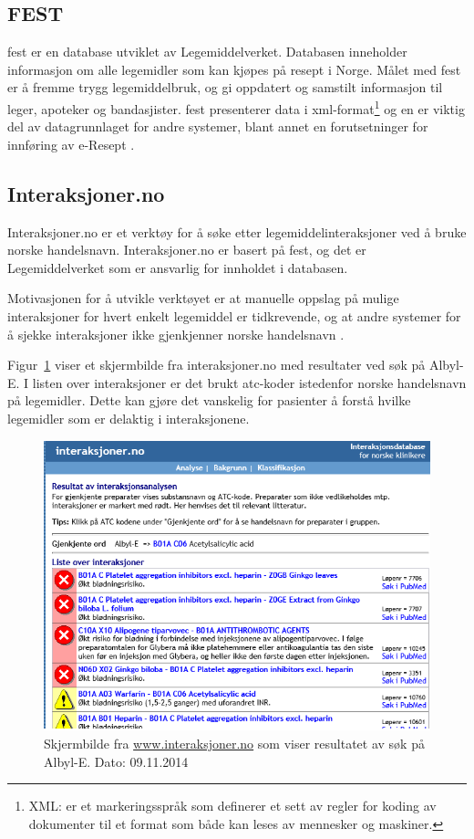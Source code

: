 \subsection{FEST}
\acrfull{fest} er en database utviklet av Legemiddelverket. Databasen inneholder informasjon om alle legemidler som kan kjøpes på resept i Norge. Målet med \acrshort{fest} er å fremme trygg legemiddelbruk, og gi oppdatert og samstilt informasjon til leger, apoteker og bandasjister. \acrshort{fest} presenterer data i \acrshort{xml}-format\footnote{XML: er et markeringsspråk som definerer et sett av regler for koding av dokumenter til et format som både kan leses av mennesker og maskiner.} og en er viktig del av datagrunnlaget for andre systemer, blant annet en forutsetninger for innføring av e-Resept \citep{omFEST}. 

\subsection{Interaksjoner.no}
Interaksjoner.no er et verktøy for å søke etter legemiddelinteraksjoner ved å bruke norske handelsnavn. Interaksjoner.no er basert på \acrshort{fest}, og det er Legemiddelverket som er ansvarlig for innholdet i databasen. 

Motivasjonen for å utvikle verktøyet er at manuelle oppslag på mulige interaksjoner for hvert enkelt legemiddel er tidkrevende, og at andre systemer for å sjekke interaksjoner ikke gjenkjenner norske handelsnavn \citep{OmInteraksjonerdotno}. 

Figur~\ref{fig:int} viser et skjermbilde fra interaksjoner.no med resultater ved søk på Albyl-E. I listen over interaksjoner er det brukt \acrshort{atc}-koder istedenfor norske handelsnavn på legemidler. Dette kan gjøre det vanskelig for pasienter å forstå hvilke legemidler som er delaktig i interaksjonene.

\begin{figure}[H]
  \centering
    \includegraphics[width=1\textwidth]{fig/dagens/interaksjoner.png}
  \caption{Skjermbilde fra \url{www.interaksjoner.no} som viser resultatet av søk på Albyl-E. Dato: 09.11.2014}
\label{fig:int}
\end{figure}


